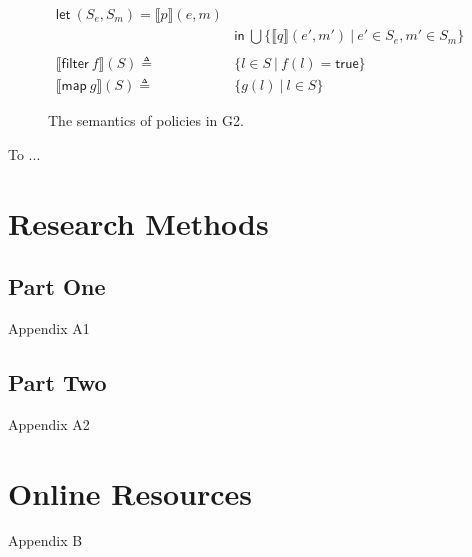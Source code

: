 \documentclass[sigconf,usenames,dvipsnames,svgnames,table]{acmart}
\newcommand{\interp}[1]{\llbracket #1 \rrbracket}
\def \sysname {\textsc{G2}\xspace}
\begin{document}
\begin{figure}
\begin{align*}
              \mathsf{let}\ (S_e, S_m) = \interp{p}(e, m)\\
              &\mathsf{in}\ \bigcup \{\interp{q}(e',m')\ |\ e'\in S_e, m'\in S_m\}\\
              \\
            \interp{\mathsf{filter}\ f}(S)
              \triangleq\ & \{l \in S\ |\ f(l) = \mathsf{true}\}\\
            \interp{\mathsf{map}\ g}(S)
              \triangleq\ &
              \{ g(l)\ |\ l\in S \} 
          \end{align*}
          \caption{The semantics of policies in \sysname.}
          \label{fig:spec:sem:pol}
        \end{figure}
\begin{acks}
To ...
\end{acks}




\appendix

\section{Research Methods}

\subsection{Part One}

Appendix A1

\subsection{Part Two}

Appendix A2

\section{Online Resources}

Appendix B
\end{document}
